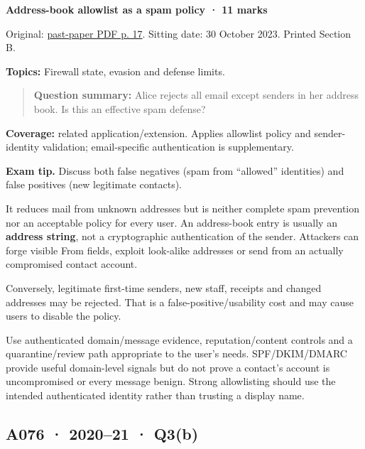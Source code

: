 \documentclass[11pt,a4paper]{article}
\begin{document}
\textbf{Address-book allowlist as a spam policy · 11 marks}


Original: \href{../../CSE405-Security_Merged.pdf\#page=17}{past-paper PDF p. 17}. Sitting date: 30 October 2023. Printed Section B.


\textbf{Topics:} Firewall state,\allowbreak{} evasion and defense limits.



\begin{quote}\small

\textbf{Question summary:} Alice rejects all email except senders in her address book. Is this an effective spam defense?



\end{quote}

\textbf{Coverage:} related application/\allowbreak{}extension. Applies allowlist policy and sender-identity validation; email-specific authentication is supplementary.



{\color{ForestGreen}\textbf{Exam tip.} Discuss both false negatives (spam from “allowed” identities) and false positives (new legitimate contacts).}


It reduces mail from unknown addresses but is neither complete spam prevention nor an acceptable policy for every user. An address-book entry is usually an \textbf{address string},\allowbreak{} not a cryptographic authentication of the sender. Attackers can forge visible From fields,\allowbreak{} exploit look-alike addresses or send from an actually compromised contact account.


Conversely,\allowbreak{} legitimate first-time senders,\allowbreak{} new staff,\allowbreak{} receipts and changed addresses may be rejected. That is a false-positive/\allowbreak{}usability cost and may cause users to disable the policy.


Use authenticated domain/\allowbreak{}message evidence,\allowbreak{} reputation/\allowbreak{}content controls and a quarantine/\allowbreak{}review path appropriate to the user's needs. SPF/\allowbreak{}DKIM/\allowbreak{}DMARC provide useful domain-level signals but do not prove a contact's account is uncompromised or every message benign. Strong allowlisting should use the intended authenticated identity rather than trusting a display name.




\clearpage
\subsection{A076 · 2020–21 · Q3(b)}\label{a076}
\end{document}
